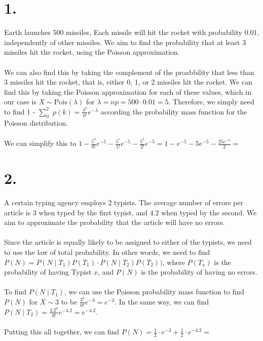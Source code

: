 \documentclass{article}
\begin{document}
\thispagestyle{firstpageheader}

\section*{1.}
{\Large 

Earth launches 500 missiles, Each missile will hit the rocket with probability 0.01, independently of other missiles. We aim to find the probability that at least 3 missiles hit the rocket, using the Poisson approximation. \\ \\ 
We can also find this by taking the complement of the proabbility that less than 3 missiles hit the rocket, that is, either 0, 1, or 2 missiles hit the rocket. We can find this by taking the Poisson approximation for each of these values, which in our case is $X \sim \text{Pois}(\lambda)$ for $\lambda = np = 500 \cdot 0.01 = 5$. Therefore, we simply need to find 1 - $\sum_{0}^{2}$ $p(k) = \frac{\lambda^k}{k!} e^{-\lambda}$
according the probability mass function for the Poisson distribution. \\ \\ 
We can simplify this to $1 - \frac{5^0}{0!}e^{-5} - \frac{5^1}{1!}e^{-5} - \frac{5^2}{2!}e^{-5} = 1 - e^{-5} - 5e^{-5} - \frac{25e^{-5}}{2} = $  

}

\section*{2.}
{\Large

A certain typing agency employs 2 typists. The average number of errors per article is 3 when
typed by the first typist, and 4.2 when typed by the second. We aim to approximate the probability that the article will have no errors. \\ \\
Since the article is equally likely to be assigned to either of the typists, we need to use the law of total probability. In other words, we need to find $P(N) = P(N \mid T_1)P(T_1) \cdot P(N \mid T_2)P(T_2))$, where $P(T_x)$ is the probability of having Typist $x$, and $P(N)$ is the probability of having no errors. \\ \\ 
To find $P(N \mid T_1)$, we can use the Poisson probability mass function to find $P(N)$ for $X \sim 3$ to be $\frac{3^0}{0!}e^{-3} = e^{-3}$. In the same way, we can find $P(N \mid T_2) = \frac{4.2^0}{0!}e^{-4.2} = e^{-4.2}$. \\ \\ 
Putting this all together, we can find $P(N) = \frac{1}{2} \cdot e^{-3} + \frac{1}{2} \cdot e^{-4.2} = $ 

}
\end{document}
